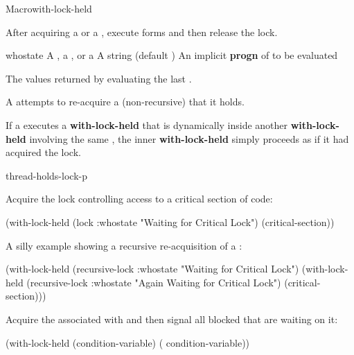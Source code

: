 
\begin{functiondoc}{Macro}{with-lock-held}{\code{(} 
    \code{)}
    \superstar{} 
    \returns{} \superstar}
%
%
%
%

\fnsyntax

\fnpurpose After acquiring a  or a ,
execute forms and then release the lock.

\fnpackage {}

\fnmodule {}

\fnargs
\begin{args}{whostate}
\arg[lock] A , a , or a 
\arg[whostate] A string (default )
\arg[forms] An implicit \textbf{progn} of  to be evaluated
\end{args}

\fnreturns The values returned by evaluating the last .

\fnerrors A  attempts to re-acquire a (non-recursive)
 that it holds.
  
\fndescription If a  executes a \textbf{with-lock-held}
that is dynamically inside another \textbf{with-lock-held} involving
the same , the inner \textbf{with-lock-held}
simply proceeds as if it had acquired the lock.

\begin{alsos}{thread-holds-lock-p}
\end{alsos}

\fnexamples
Acquire the lock controlling access to a critical section of code:
%
\W\supp
\begin{example}
  (with-lock-held (lock :whostate "Waiting for Critical Lock")
    (critical-section))
\end{example}
%
A silly example showing a recursive re-acquisition of a
:
%
\W\supp\notpretop
\begin{example}
  (with-lock-held (recursive-lock :whostate "Waiting for Critical Lock")
    (with-lock-held (recursive-lock :whostate "Again Waiting for Critical Lock")
      (critical-section)))
\end{example}
%
%
%
Acquire the  associated with  and then
signal all blocked  that are waiting on it:
%
\W\supp\notpretop
\begin{example}
  (with-lock-held (condition-variable)
    ( condition-variable))
\end{example}


\end{functiondoc}
